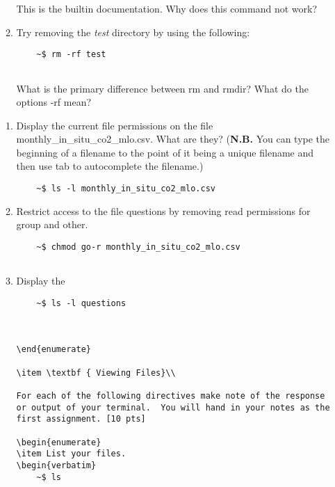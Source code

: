\documentclass[11 pt,USletter,oneside]{article}
\begin{document}
\begin{enumerate}
\begin{enumerate}
\begin{verbatim}
\end{verbatim}

This is the builtin documentation. Why does this command not work?\\
\item Try removing the \textit { test} directory by using the following:
\begin{verbatim}
	~$ rm -rf test
	
\end{verbatim}
What is the primary difference between rm and rmdir?  What do the options -rf mean?\\

    \end{enumerate}
    

\begin{enumerate}
\item Display the current file permissions on the file monthly\_in\_situ\_co2\_mlo.csv.  What are they? (\textbf{N.B.} You can type the beginning of a filename to the point of it being a unique filename and then use tab to autocomplete the filename.)
\begin{verbatim}
	~$ ls -l monthly_in_situ_co2_mlo.csv 

\end{verbatim}


\item Restrict access to the file questions by removing read permissions for group and other. 

\begin{verbatim}
	~$ chmod go-r monthly_in_situ_co2_mlo.csv
	
\end{verbatim}

\item Display the
\begin{verbatim}
	~$ ls -l questions
	


\end{enumerate}

\item \textbf { Viewing Files}\\

For each of the following directives make note of the response or output of your terminal.  You will hand in your notes as the first assignment. [10 pts] 

\begin{enumerate}
\item List your files.
\begin{verbatim}
	~$ ls
\end{verbatim}


\end{enumerate}
\end{enumerate}
\end{document}
